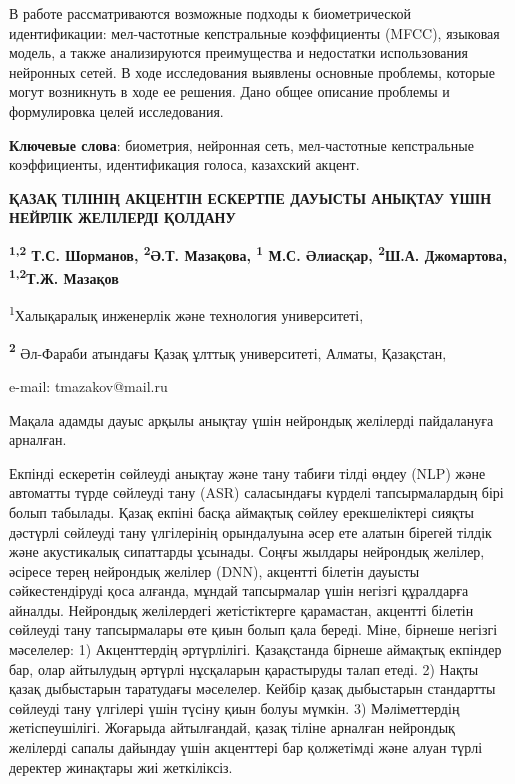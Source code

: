 В работе рассматриваются возможные подходы к биометрической
идентификации: мел-частотные кепстральные коэффициенты (MFCC), языковая
модель, а также анализируются преимущества и недостатки использования
нейронных сетей. В ходе исследования выявлены основные проблемы, которые
могут возникнуть в ходе ее решения. Дано общее описание проблемы и
формулировка целей исследования.

{\bfseries Ключевые слова}: биометрия, нейронная сеть, мел-частотные
кепстральные коэффициенты, идентификация голоса, казахский акцент.

\begin{articleheader}
{\bfseries ҚАЗАҚ ТІЛІНІҢ АКЦЕНТІН ЕСКЕРТПЕ ДАУЫСТЫ АНЫҚТАУ ҮШІН НЕЙРЛІК
ЖЕЛІЛЕРДІ ҚОЛДАНУ}

{\bfseries \textsuperscript{1,2} Т.С. Шорманов, \textsuperscript{2}Ә.Т.
Мазақова, \textsuperscript{1} М.С. Әлиасқар, \textsuperscript{2}Ш.А.
Джомартова,}
{\bfseries \textsuperscript{1,2}Т.Ж. Мазақов\textsuperscript{\envelope }}
\end{articleheader}
\begin{affiliation}

\textsuperscript{1}Халықаралық инженерлік және технология университеті,

{\bfseries \textsuperscript{2}} Әл-Фараби атындағы Қазақ ұлттық
университеті, Алматы, Қазақстан,

e-mail: tmazakov@mail.ru
\end{affiliation}

Мақала адамды дауыс арқылы анықтау үшін нейрондық желілерді пайдалануға
арналған.

Екпінді ескеретін сөйлеуді анықтау және тану табиғи тілді өңдеу (NLP)
және автоматты түрде сөйлеуді тану (ASR) саласындағы күрделі
тапсырмалардың бірі болып табылады. Қазақ екпіні басқа аймақтық сөйлеу
ерекшеліктері сияқты дәстүрлі сөйлеуді тану үлгілерінің орындалуына әсер
ете алатын бірегей тілдік және акустикалық сипаттарды ұсынады. Соңғы
жылдары нейрондық желілер, әсіресе терең нейрондық желілер (DNN),
акцентті білетін дауысты сәйкестендіруді қоса алғанда, мұндай
тапсырмалар үшін негізгі құралдарға айналды. Нейрондық желілердегі
жетістіктерге қарамастан, акцентті білетін сөйлеуді тану тапсырмалары
өте қиын болып қала береді. Міне, бірнеше негізгі мәселелер: 1)
Акценттердің әртүрлілігі. Қазақстанда бірнеше аймақтық екпіндер бар,
олар айтылудың әртүрлі нұсқаларын қарастыруды талап етеді. 2) Нақты
қазақ дыбыстарын таратудағы мәселелер. Кейбір қазақ дыбыстарын
стандартты сөйлеуді тану үлгілері үшін түсіну қиын болуы мүмкін. 3)
Мәліметтердің жетіспеушілігі. Жоғарыда айтылғандай, қазақ тіліне
арналған нейрондық желілерді сапалы дайындау үшін акценттері бар
қолжетімді және алуан түрлі деректер жинақтары жиі жеткіліксіз.

